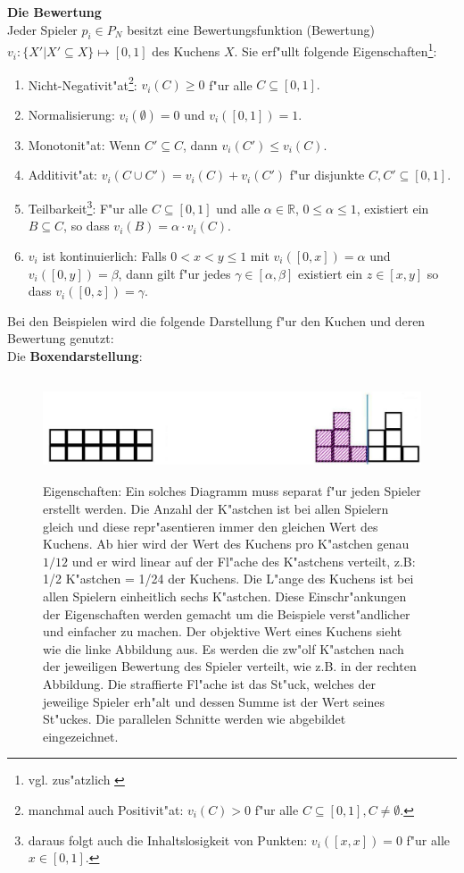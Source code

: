 \documentclass[11pt, a4paper, twoside]{article}
\numberwithin{equation}{section}
\begin{document}
\newline
\textbf{Die Bewertung} \\
\newline
Jeder Spieler $p_i \in P_N$ besitzt eine Bewertungsfunktion (Bewertung) $v_i:\{X'|X'\subseteq X\}\mapsto [0,1]$ des Kuchens $X$. Sie erf"ullt folgende Eigenschaften\footnote{vgl. zus"atzlich \cite{24}}:
\begin{enumerate}
\item Nicht-Negativit"at\footnote{manchmal auch Positivit"at: $v_i(C)> 0$ f"ur alle $C\subseteq [0,1], C \neq \emptyset.$}: $v_i(C)\geq 0$ f"ur alle $C\subseteq [0,1].$
\item Normalisierung: $v_i(\emptyset)=0$ und $v_i([0,1])=1.$
\item Monotonit"at: Wenn $C' \subseteq C$, dann $v_i(C') \leq v_i(C).$
\item Additivit"at: $v_i(C \cup C')=v_i(C)+v_i(C')$ f"ur disjunkte $C,C'\subseteq [0,1].$
\item Teilbarkeit\footnote{daraus folgt auch die Inhaltslosigkeit von Punkten:  $v_i([x,x])=0$ f"ur alle $x\in [0,1].$}: F"ur alle $C\subseteq [0,1]$ und alle $\alpha \in \mathbb{R}$, $0\leq \alpha \leq 1$, existiert ein $B\subseteq C$, so dass  $v_i(B)=\alpha \cdot v_i(C).$
\item  $v_i$ ist kontinuierlich: Falls $0<x<y\leq 1$ mit $v_i([0,x])=\alpha$ und $v_i([0,y])=\beta$, dann gilt f"ur jedes $\gamma \in [\alpha,\beta]$ existiert ein $z \in [x,y]$ so dass $v_i([0,z])=\gamma.$
\end{enumerate}
Bei den Beispielen wird die folgende Darstellung f"ur den Kuchen und deren Bewertung genutzt:\\
\newline
Die \textbf{Boxendarstellung}:
\begin{figure}[h!]
\center
 \includegraphics[height=3cm]{cc1svv.jpg}
\caption[Beispiel f"ur die Boxendarstellung eines Kuchens]{Eigenschaften: Ein solches Diagramm muss separat f"ur jeden Spieler erstellt werden. Die Anzahl der K"astchen ist bei allen Spielern gleich und diese repr"asentieren immer den gleichen Wert des Kuchens. Ab hier wird der Wert des Kuchens pro K"astchen genau $1/12$ und er wird linear auf der Fl"ache des K"astchens verteilt, z.B: 1/2 K"astchen = 1/24 der Kuchens. Die L"ange des Kuchens ist bei allen Spielern einheitlich sechs K"astchen. Diese Einschr"ankungen der Eigenschaften werden gemacht um die Beispiele verst"andlicher und einfacher zu machen. Der objektive Wert eines Kuchens sieht wie die linke Abbildung aus. Es werden die zw"olf K"astchen nach der jeweiligen Bewertung des Spieler verteilt, wie z.B. in der rechten Abbildung. Die straffierte Fl"ache ist das St"uck, welches der jeweilige Spieler erh"alt und dessen Summe ist der Wert seines St"uckes. Die parallelen Schnitte werden wie abgebildet eingezeichnet.}
\end{figure}
\end{document}
